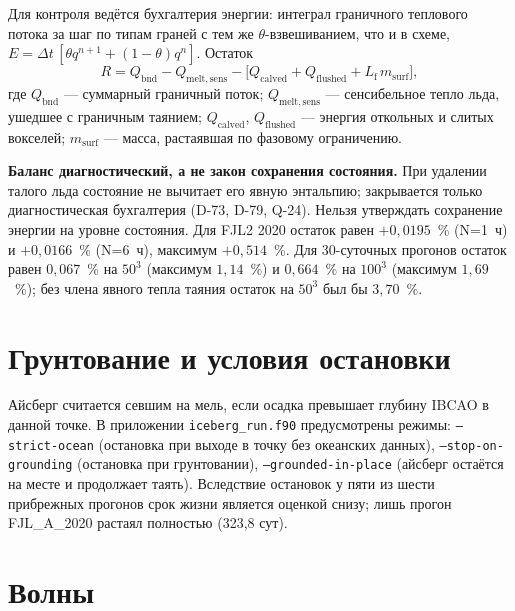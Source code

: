 \documentclass[12pt,a4paper]{article}
\newcommand{\Lf}{L_{\mathrm f}}
\newcommand{\code}[1]{\texttt{\small #1}}
\begin{document}
Для контроля ведётся бухгалтерия энергии: интеграл граничного теплового потока за шаг по типам граней с тем же $\theta$-взвешиванием, что и в схеме, $E=\Delta t\,[\theta q^{n+1}+(1-\theta)q^{n}]$. Остаток
\begin{equation}
R=Q_{\mathrm{bnd}}-Q_{\mathrm{melt,sens}}-\bigl[Q_{\mathrm{calved}}+Q_{\mathrm{flushed}}+\Lf\,m_{\mathrm{surf}}\bigr],
\end{equation}
где $Q_{\mathrm{bnd}}$ --- суммарный граничный поток; $Q_{\mathrm{melt,sens}}$ --- сенсибельное тепло льда, ушедшее с граничным таянием; $Q_{\mathrm{calved}}$, $Q_{\mathrm{flushed}}$ --- энергия откольных и слитых вокселей; $m_{\mathrm{surf}}$ --- масса, растаявшая по фазовому ограничению.

\textbf{Баланс диагностический, а не закон сохранения состояния.} При удалении талого льда состояние не вычитает его явную энтальпию; закрывается только диагностическая бухгалтерия (D-73, D-79, Q-24). Нельзя утверждать сохранение энергии на уровне состояния. Для FJL2 2020 остаток равен $+0{,}0195$~\% (N=1~ч) и $+0{,}0166$~\% (N=6~ч), максимум $+0{,}514$~\%. Для 30-суточных прогонов остаток равен $0{,}067$~\% на $50^3$ (максимум $1{,}14$~\%) и $0{,}664$~\% на $100^3$ (максимум $1{,}69$~\%); без члена явного тепла таяния остаток на $50^3$ был бы $3{,}70$~\%.

\section{Грунтование и условия остановки}

Айсберг считается севшим на мель, если осадка превышает глубину IBCAO в данной точке. В приложении \code{iceberg\_run.f90} предусмотрены режимы: \code{--strict-ocean} (остановка при выходе в точку без океанских данных), \code{--stop-on-grounding} (остановка при грунтовании), \code{--grounded-in-place} (айсберг остаётся на месте и продолжает таять). Вследствие остановок у пяти из шести прибрежных прогонов срок жизни является оценкой снизу; лишь прогон FJL\_A\_2020 растаял полностью (323{,}8 сут).

\section{Волны}\label{sec:waves}
\end{document}
